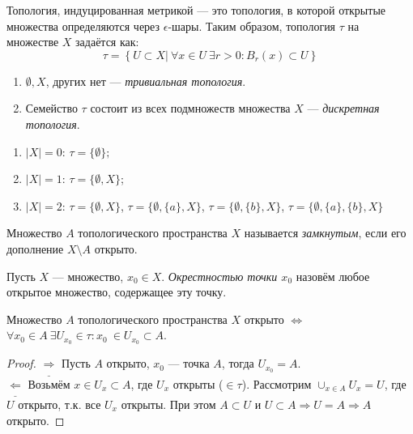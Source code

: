 Топология, индуцированная метрикой — это топология, в которой открытые множества определяются через $\epsilon$-шары. Таким образом, топология $\tau$ на множестве $X$ задаётся как:
\[\tau = \left\{U \subset X | \ \forall x \in U \ \exists r > 0: B_r(x) \subset U\right\}\]

\begin{example}
    \begin{enumerate}
        $\empty$
        \item $\emptyset, X$, других нет — \textit{тривиальная топология}.
        \item Семейство $\tau$ состоит из всех подмножеств множества $X$ — \textit{дискретная топология}.
    \end{enumerate}
\end{example}

\begin{example} 
    \begin{enumerate}
        $\empty$
        \item $|X| = 0$: $\tau = \{\emptyset\};$
        \item $|X| = 1$: $\tau = \{\emptyset, X\}$;
        \item $|X| = 2$: $\tau = \{\emptyset, X\}$, $\tau = \{\emptyset, \{a\}, X\}$, $\tau = \{\emptyset, \{b\}, X\}$, $\tau = \{\emptyset, \{a\}, \{b\}, X\}$
    \end{enumerate}
\end{example}

\begin{definition}
    Множество $A$ топологического пространства $X$ называется \textit{замкнутым}, если его дополнение $X \setminus A$ открыто.
\end{definition}

\begin{definition}
    Пусть $X$ — множество, $x_0 \in X$. \textit{Окрестностью точки $x_0$} назовём любое открытое множество, содержащее эту точку.
\end{definition}

\begin{statement}
    Множество $A$ топологического пространства $X$ открыто $\Longleftrightarrow$ $\forall x_0 \in A \ \exists U_{x_0} \in \tau: x_0 \ \in U_{x_0} \subset A$.
\end{statement}
\begin{proof}
    $\underline{\Longrightarrow}$ Пусть $A$ открыто, $x_0$ — точка $A$, тогда $U_{x_0} = A$. \\
    $\underline{\Longleftarrow}$ Возьмём $x \in U_x \subset A$, где $U_x$ открыты ($\in \tau$).
    Рассмотрим $\cup_{x \in A} U_x = U$, где $U$ открыто, т.к. все $U_x$ открыты.
    При этом $A \subset U$ и $U \subset A \Longrightarrow U = A \Longrightarrow A$ открыто.
\end{proof}


